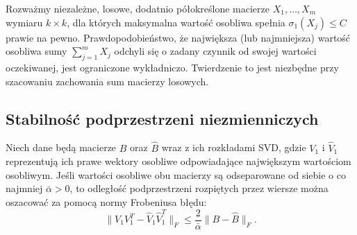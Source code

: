 \begin{tw}
Rozważmy niezależne, losowe, dodatnio półokreślone macierze $X_1, \dots, X_m$ wymiaru $k \times k$, dla których maksymalna wartość osobliwa spełnia $\sigma_1(X_j) \le C$ prawie na pewno. Prawdopodobieństwo, że największa (lub najmniejsza) wartość osobliwa sumy $\sum_{j=1}^m X_j$ odchyli się o zadany czynnik od swojej wartości oczekiwanej, jest ograniczone wykładniczo. Twierdzenie to jest niezbędne przy szacowaniu zachowania sum macierzy losowych.
\end{tw}

\subsection{Stabilność podprzestrzeni niezmienniczych}

\begin{tw}
Niech dane będą macierze $B$ oraz $\hat{B}$ wraz z ich rozkładami SVD, gdzie $V_1$ i $\hat{V}_1$ reprezentują ich prawe wektory osobliwe odpowiadające największym wartościom osobliwym. Jeśli wartości osobliwe obu macierzy są odseparowane od siebie o co najmniej $\bar{\alpha} > 0$, to odległość podprzestrzeni rozpiętych przez wiersze można oszacować za pomocą normy Frobeniusa błędu: 
$$\|V_1 V_1^T - \hat{V}_1 \hat{V}_1^T\|_F \le \frac{2}{\bar{\alpha}}\|B - \hat{B}\|_F.$$
\end{tw}